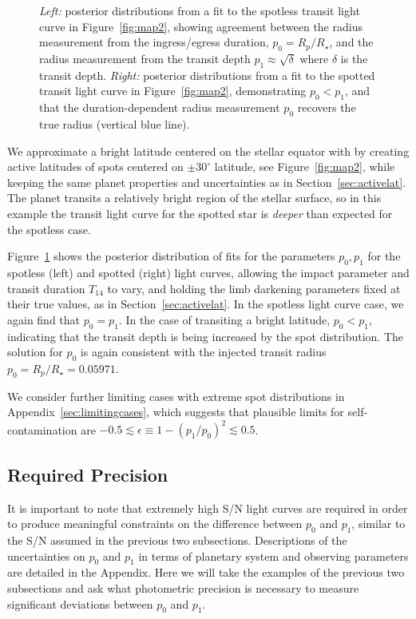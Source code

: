 \begin{figure}
    \caption{\textsl{Left:} posterior distributions from a fit to the spotless transit light curve in Figure~\ref{fig:map2}, showing agreement between the radius measurement from the ingress/egress duration, $p_0 = R_p/R_\star$, and the radius measurement from the transit depth $p_1 \approx \sqrt{\delta}$ where $\delta$ is the transit depth. \textsl{Right:} posterior distributions from a fit to the spotted transit light curve in Figure~\ref{fig:map2}, demonstrating $p_0 < p_1$, and that the duration-dependent radius measurement $p_0$ recovers the true radius (vertical blue line).}
    \label{fig:corners2}
\end{figure}

We approximate a bright latitude centered on the stellar equator with \stsp by creating active latitudes of spots centered on $\pm30^\circ$ latitude, see Figure~\ref{fig:map2}, while keeping the same planet properties and uncertainties as in Section~\ref{sec:activelat}. The planet transits a relatively bright region of the stellar surface, so in this example the transit light curve for the spotted star is \textit{deeper} than expected for the spotless case. 

Figure~\ref{fig:corners2} shows the posterior distribution of fits for the parameters $p_0, p_1$ for the spotless (left) and spotted (right) light curves, allowing the impact parameter and transit duration $T_{14}$ to vary, and holding the limb darkening parameters fixed at their true values, as in Section~\ref{sec:activelat}. In the spotless light curve case, we again find that $p_0 = p_1$. In the case of transiting a bright latitude, $p_0 < p_1$, indicating that the transit depth is being increased by the spot distribution. The solution for $p_0$ is again consistent with the injected transit radius $p_0=R_p/R_\star = 0.05971$. 

We consider further limiting cases with extreme spot distributions in Appendix~\ref{sec:limitingcases}, which suggests that plausible limits for self-contamination are $-0.5 \lesssim \epsilon \equiv 1 - (p_1/p_0)^2 \lesssim 0.5$.

\subsection{Required Precision}

It is important to note that extremely high S/N light curves are required in order to produce meaningful constraints on the difference between $p_0$ and $p_1$, similar to the S/N assumed in the previous two subsections. Descriptions of the uncertainties on $p_0$ and $p_1$ in terms of planetary system and observing parameters are detailed in the Appendix. Here we will take the examples of the previous two subsections and ask what photometric precision is necessary to measure significant deviations between $p_0$ and $p_1$. 

